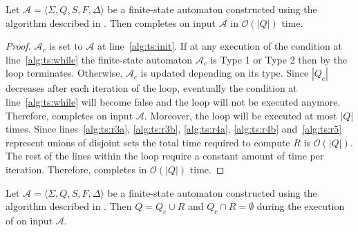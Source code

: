 \begin{proposition}\label{prop:thompson_sep_2}
  Let $\mathcal{A} = \langle \Sigma, Q, S, F, \Delta \rangle$ be a finite-state
  automaton constructed using the algorithm described in . Then
   completes on input $\mathcal{A}$ in
  $\mathcal{O}(|Q|)$ time.
\end{proposition}

\begin{proof}
  $\mathcal{A}_c$ is set to $\mathcal{A}$ at line~\ref{alg:ts:init}. If at any execution of
  the condition at line~\ref{alg:ts:while} the finite-state automaton $\mathcal{A}_c$
  is Type 1 or Type 2 then by  the loop
  terminates. Otherwise, $\mathcal{A}_c$ is updated depending on its type.
  Since $|Q_c|$ decreases after each iteration of the loop, eventually the
  condition at line~\ref{alg:ts:while} will become false and the loop will not be executed
  anymore. Therefore,  completes on
  input $\mathcal{A}$. Moreover, the loop will be executed at most $|Q|$
  times. Since lines~\ref{alg:ts:r3a}, \ref{alg:ts:r3b}, \ref{alg:ts:r4a},
  \ref{alg:ts:r4b} and~\ref{alg:ts:r5} represent unions of disjoint sets
  the total time required to compute $R$ is $\mathcal{O}(|Q|)$. The rest of
  the lines within the loop require a constant amount of time per iteration.
  Therefore,  completes in
  $\mathcal{O}(|Q|)$ time.
\end{proof}

\begin{proposition}\label{prop:thompson_sep_3}
  Let $\mathcal{A} = \langle \Sigma, Q, S, F, \Delta \rangle$ be a finite-state
  automaton constructed using the algorithm described in . Then $Q
  = Q_c \cup R$ and $Q_c \cap R = \emptyset$ during the execution of
   on input $\mathcal{A}$.
\end{proposition}

